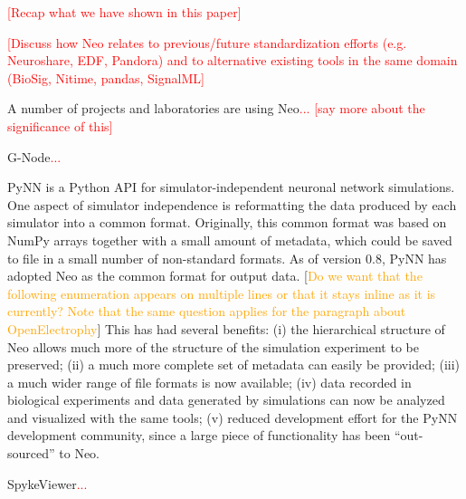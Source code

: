 \documentclass{frontiers}
\newcommand{\missing}[1]{\textcolor{red}{#1}}
\newcommand{\florent}[1]{[\textcolor{Orange}{#1}]}
\begin{document}
\missing{[Recap what we have shown in this paper]}

\missing{[Discuss how Neo relates to previous/future standardization efforts (e.g. Neuroshare, EDF, Pandora) and to alternative existing tools in the same domain (BioSig, Nitime, pandas, SignalML]}

  


A number of projects and laboratories are using Neo\missing{... [say more about the significance of this]}

G-Node\missing{...}

PyNN \citep{Davison2009} is a Python API for simulator-independent neuronal network simulations.
One aspect of simulator independence is reformatting the data produced by each simulator into a common format.
Originally, this common format was based on NumPy arrays together with a small amount of metadata, which could be saved to file in a small number of non-standard formats.
As of version 0.8, PyNN has adopted Neo as the common format for output data.
\florent{Do we want that the following enumeration appears on multiple lines or that it stays inline as it is currently? Note that the same question applies for the paragraph about OpenElectrophy}
This has had several benefits:
  (i)   the hierarchical structure of Neo allows much more of the structure of the simulation experiment to be preserved;
  (ii)  a much more complete set of metadata can easily be provided;
  (iii) a much wider range of file formats is now available;
  (iv)  data recorded in biological experiments and data generated by simulations can now be analyzed and visualized with the same tools; 
  (v)   reduced development effort for the PyNN development community, since a large piece of functionality has been ``out-sourced'' to Neo.

SpykeViewer\missing{...}
\end{document}

